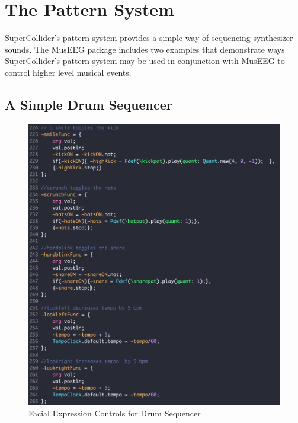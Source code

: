 \pagebreak



\section{The Pattern System}

SuperCollider's pattern system provides a simple way of sequencing synthesizer sounds. The MusEEG package includes two examples that demonstrate ways SuperCollider's pattern system may be used in conjunction with MusEEG to control higher level musical events. 

\subsection{A Simple Drum Sequencer}

\begin{figure}[htbp]
	\centering
		\includegraphics[width=1\columnwidth]{drumsequencer.png}
	\caption{Facial Expression Controls for Drum Sequencer}
	\label{fig:drumsequencer}
\end{figure}

